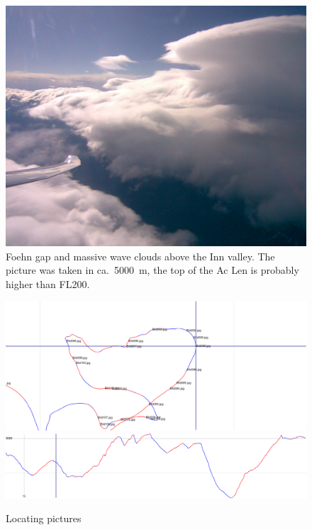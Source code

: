 \begin{figure}[h]
\caption{\label{foehngap}Foehn gap and massive wave clouds above the Inn valley. The picture was taken in ca.~5000~m, the top of the Ac Len is probably higher than FL200.}
\begin{center}
\includegraphics[width=\textwidth]{png/Bild088.jpg}
\end{center}
\end{figure}

\begin{figure}[h]
\caption{\label{pic88}Locating pictures}
\begin{center}
\includegraphics[width=\textwidth]{png/pic88fvw}
\includegraphics[width=\textwidth]{png/pic88fvwbaro}
\end{center}
\end{figure}


